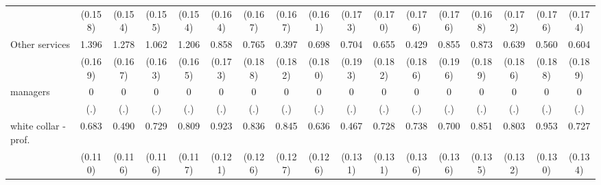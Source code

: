 {\begin{tabular}{l*{16}{c}}
                    &     (0.158)         &     (0.154)         &     (0.155)         &     (0.154)         &     (0.164)         &     (0.167)         &     (0.167)         &     (0.161)         &     (0.173)         &     (0.170)         &     (0.176)         &     (0.176)         &     (0.168)         &     (0.172)         &     (0.176)         &     (0.174)         \\
[1em]
Other services      &       1.396\sym{***}&       1.278\sym{***}&       1.062\sym{***}&       1.206\sym{***}&       0.858\sym{***}&       0.765\sym{***}&       0.397\sym{*}  &       0.698\sym{***}&       0.704\sym{***}&       0.655\sym{***}&       0.429\sym{*}  &       0.855\sym{***}&       0.873\sym{***}&       0.639\sym{***}&       0.560\sym{**} &       0.604\sym{**} \\
                    &     (0.169)         &     (0.167)         &     (0.163)         &     (0.165)         &     (0.173)         &     (0.188)         &     (0.182)         &     (0.180)         &     (0.193)         &     (0.182)         &     (0.186)         &     (0.196)         &     (0.189)         &     (0.186)         &     (0.188)         &     (0.189)         \\
[1em]
managers            &           0         &           0         &           0         &           0         &           0         &           0         &           0         &           0         &           0         &           0         &           0         &           0         &           0         &           0         &           0         &           0         \\
                    &         (.)         &         (.)         &         (.)         &         (.)         &         (.)         &         (.)         &         (.)         &         (.)         &         (.)         &         (.)         &         (.)         &         (.)         &         (.)         &         (.)         &         (.)         &         (.)         \\
[1em]
white collar - prof.&       0.683\sym{***}&       0.490\sym{***}&       0.729\sym{***}&       0.809\sym{***}&       0.923\sym{***}&       0.836\sym{***}&       0.845\sym{***}&       0.636\sym{***}&       0.467\sym{***}&       0.728\sym{***}&       0.738\sym{***}&       0.700\sym{***}&       0.851\sym{***}&       0.803\sym{***}&       0.953\sym{***}&       0.727\sym{***}\\
                    &     (0.110)         &     (0.116)         &     (0.116)         &     (0.117)         &     (0.121)         &     (0.126)         &     (0.127)         &     (0.126)         &     (0.131)         &     (0.131)         &     (0.136)         &     (0.136)         &     (0.135)         &     (0.132)         &     (0.130)         &     (0.134)         \\

\end{tabular}}
